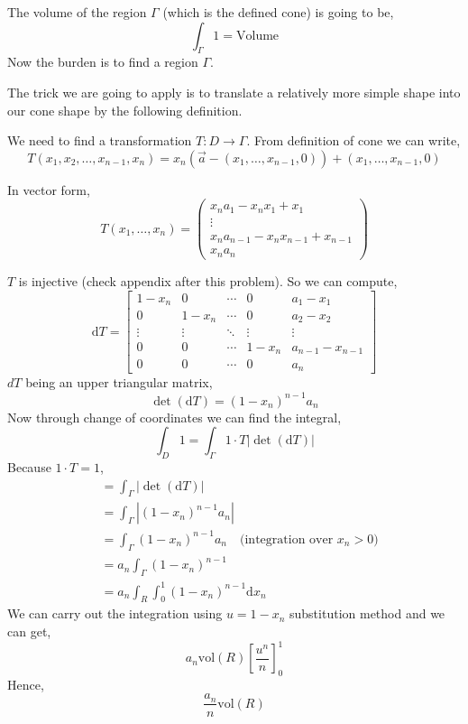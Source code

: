 \documentclass[letter]{article}
\begin{document}
The volume of the region $\Gamma$ (which is the defined cone) is going to be,
\[
\int_\Gamma 1 = \text{Volume}
\] 
Now the burden is to find a region $\Gamma$. 

The trick we are going to apply is to translate a relatively more simple shape into our cone shape by the following definition. 

We need to find a transformation $T : D \to \Gamma$. From definition of cone we can write, 
\[
	T(x_1, x_2, \ldots, x_{n-1}, x_n) = 
	x_n (\vec{a} - (x_1, \ldots, x_{n-1}, 0 ) ) + 
	(x_1 , \ldots, x_{n-1}, 0)
\]

In vector form, 
\[
T(x_1, \ldots, x_n) = 
\begin{pmatrix} x_n a_1 - x_n x_1 + x_1 \\
\vdots \\
x_n a_{n-1} - x_n x_{n-1} + x_{n-1} \\ 
x_n a_n \end{pmatrix} 
\]

$T$ is injective (check appendix after this problem). So we can compute, 
\[
\mathrm{d} T = 
\begin{bmatrix} 1- x_n & 0 & \cdots & 0 & a_1-x_1 \\ 
	0 & 1-x_n & \cdots & 0 & a_2 - x_2 \\ 
	\vdots & \vdots & \ddots & \vdots & \vdots \\
	0 & 0 & \cdots & 1-x_n & a_{n-1} - x_{n-1} \\ 
	0 & 0 & \cdots & 0 & a_n 
\end{bmatrix} 
\]
$dT $ being an upper triangular matrix, 
\[
\det (\mathrm{d} T) = (1-x_n)^{n-1} a_n
\]
Now through change of coordinates we can find the integral, 
\[
\int_D 1 = \int_\Gamma 1 \cdot T | \det (\mathrm{d} T) | 
\]
Because $1\cdot T = 1$, 
\begin{align*}
	&= \int_\Gamma | \det(\mathrm{d} T) | \\
	&= \int_\Gamma | (1-x_n)^{n-1} a_n | \\
	&= \int_\Gamma (1-x_n)^{n-1} a_n \quad \text{(integration over $x_n > 0$)} \\
	&= a_n \int_\Gamma (1- x_n )^{n-1} \\
	&= a_n \int_{R}^{} \int_{0}^{1} (1- x_n)^{n-1} \mathrm{d} x_n   
\end{align*}
We can carry out the integration using $u = 1- x_n$ substitution method and we can get, 
\[
	a_n \text{vol}(R) \left[\frac{u^{n}}{n}\right]_0^{1}
\]
Hence, 
\[
\boxed{
\frac{a_n}{n} \text{vol}(R)
}
\] 
\end{document}
